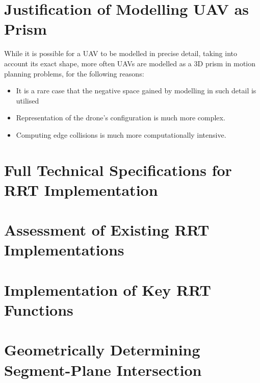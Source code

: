 
\section{Justification of Modelling UAV as Prism}
\label{section:rrt_appendix_modelling}
    While it is possible for a \gls{UAV} to be modelled in precise detail, taking into account its exact shape, more often \glspl{UAV} are modelled as a 3D prism in motion planning problems, for the following reasons:
    \begin{itemize}
    \item It is a rare case that the negative space gained by modelling in such detail is utilised
    \item Representation of the drone's configuration is much more complex.
    \item Computing edge collisions is much more computationally intensive.
    \end{itemize}

    

\section{Full Technical Specifications for RRT Implementation}
\label{section:rrt_appendix_tech_specs}
    

\section{Assessment of Existing RRT Implementations}
\label{section:rrt_appendix_existing_implementations}
    

\section{Implementation of Key RRT Functions}
\label{section:rrt_appendix_function_impl}
    

\newpage
\section{Geometrically Determining Segment-Plane Intersection}
\label{section:rrt_appendix_line_plane_intersection}
    

